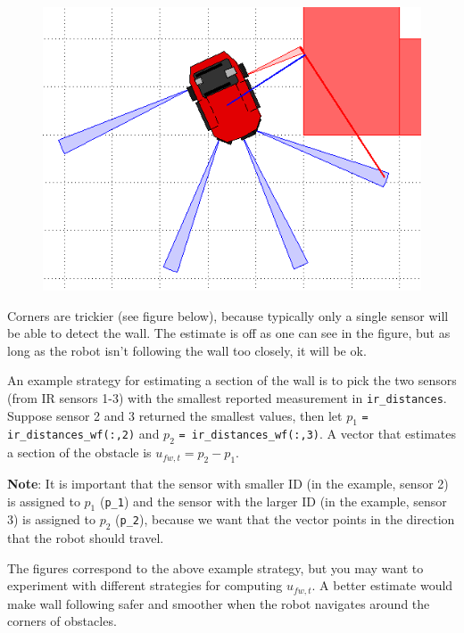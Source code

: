 \documentclass[10pt]{article}
\begin{document}
\begin{enumerate}
	\begin{figure}[h]
		\centering
		\includegraphics[scale=0.5]{images/week-6-part-1b.png}
		\label{fig:week6part2}
	\end{figure}
	
	Corners are trickier (see figure below), because typically only a single sensor will be able to detect the wall. The estimate is off as one can see in the figure, but as long as the robot isn't following the wall too closely, it will be ok.
	
	An example strategy for estimating a section of the wall is to pick the two sensors (from IR sensors 1-3) with the smallest reported measurement in \texttt{ir\_distances}. Suppose sensor 2 and 3 returned the smallest values, then let $p_1$ \texttt{= ir\_distances\_wf(:,2)} and $p_2$ \texttt{= ir\_distances\_wf(:,3)}. A vector that estimates a section of the obstacle is $u_{fw,t}=p_2-p_1$. 
	
	\textbf{Note}: It is important that the sensor with smaller ID (in the example, sensor 2) is assigned to $p_1$ (\texttt{p\_1}) and the sensor with the larger ID (in the example, sensor 3) is assigned to $p_2$ (\texttt{p\_2}), because we want that the vector points in the direction that the robot should travel.
	
	The figures correspond to the above example strategy, but you may want to experiment with different strategies for computing $u_{fw,t}$. A better estimate would make wall following safer and smoother when the robot navigates around the corners of obstacles. 
	

\end{enumerate}
\end{document}
